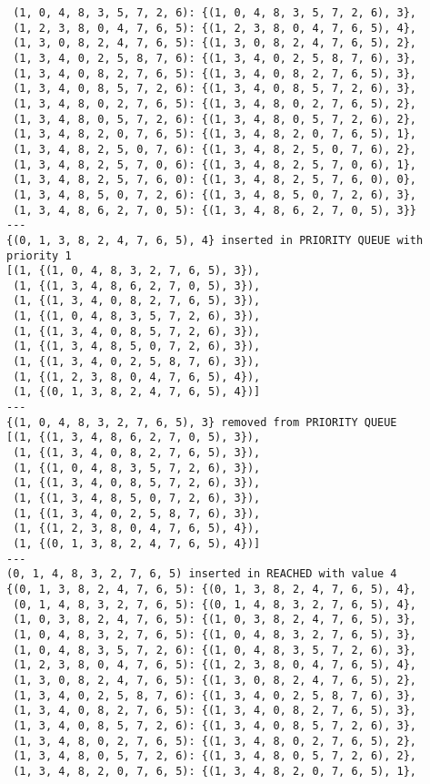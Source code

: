 \documentclass{article}
\begin{document}
\begin{verbatim}
 (1, 0, 4, 8, 3, 5, 7, 2, 6): {(1, 0, 4, 8, 3, 5, 7, 2, 6), 3},
 (1, 2, 3, 8, 0, 4, 7, 6, 5): {(1, 2, 3, 8, 0, 4, 7, 6, 5), 4},
 (1, 3, 0, 8, 2, 4, 7, 6, 5): {(1, 3, 0, 8, 2, 4, 7, 6, 5), 2},
 (1, 3, 4, 0, 2, 5, 8, 7, 6): {(1, 3, 4, 0, 2, 5, 8, 7, 6), 3},
 (1, 3, 4, 0, 8, 2, 7, 6, 5): {(1, 3, 4, 0, 8, 2, 7, 6, 5), 3},
 (1, 3, 4, 0, 8, 5, 7, 2, 6): {(1, 3, 4, 0, 8, 5, 7, 2, 6), 3},
 (1, 3, 4, 8, 0, 2, 7, 6, 5): {(1, 3, 4, 8, 0, 2, 7, 6, 5), 2},
 (1, 3, 4, 8, 0, 5, 7, 2, 6): {(1, 3, 4, 8, 0, 5, 7, 2, 6), 2},
 (1, 3, 4, 8, 2, 0, 7, 6, 5): {(1, 3, 4, 8, 2, 0, 7, 6, 5), 1},
 (1, 3, 4, 8, 2, 5, 0, 7, 6): {(1, 3, 4, 8, 2, 5, 0, 7, 6), 2},
 (1, 3, 4, 8, 2, 5, 7, 0, 6): {(1, 3, 4, 8, 2, 5, 7, 0, 6), 1},
 (1, 3, 4, 8, 2, 5, 7, 6, 0): {(1, 3, 4, 8, 2, 5, 7, 6, 0), 0},
 (1, 3, 4, 8, 5, 0, 7, 2, 6): {(1, 3, 4, 8, 5, 0, 7, 2, 6), 3},
 (1, 3, 4, 8, 6, 2, 7, 0, 5): {(1, 3, 4, 8, 6, 2, 7, 0, 5), 3}}
---
{(0, 1, 3, 8, 2, 4, 7, 6, 5), 4} inserted in PRIORITY QUEUE with priority 1
[(1, {(1, 0, 4, 8, 3, 2, 7, 6, 5), 3}),
 (1, {(1, 3, 4, 8, 6, 2, 7, 0, 5), 3}),
 (1, {(1, 3, 4, 0, 8, 2, 7, 6, 5), 3}),
 (1, {(1, 0, 4, 8, 3, 5, 7, 2, 6), 3}),
 (1, {(1, 3, 4, 0, 8, 5, 7, 2, 6), 3}),
 (1, {(1, 3, 4, 8, 5, 0, 7, 2, 6), 3}),
 (1, {(1, 3, 4, 0, 2, 5, 8, 7, 6), 3}),
 (1, {(1, 2, 3, 8, 0, 4, 7, 6, 5), 4}),
 (1, {(0, 1, 3, 8, 2, 4, 7, 6, 5), 4})]
---
{(1, 0, 4, 8, 3, 2, 7, 6, 5), 3} removed from PRIORITY QUEUE
[(1, {(1, 3, 4, 8, 6, 2, 7, 0, 5), 3}),
 (1, {(1, 3, 4, 0, 8, 2, 7, 6, 5), 3}),
 (1, {(1, 0, 4, 8, 3, 5, 7, 2, 6), 3}),
 (1, {(1, 3, 4, 0, 8, 5, 7, 2, 6), 3}),
 (1, {(1, 3, 4, 8, 5, 0, 7, 2, 6), 3}),
 (1, {(1, 3, 4, 0, 2, 5, 8, 7, 6), 3}),
 (1, {(1, 2, 3, 8, 0, 4, 7, 6, 5), 4}),
 (1, {(0, 1, 3, 8, 2, 4, 7, 6, 5), 4})]
---
(0, 1, 4, 8, 3, 2, 7, 6, 5) inserted in REACHED with value 4
{(0, 1, 3, 8, 2, 4, 7, 6, 5): {(0, 1, 3, 8, 2, 4, 7, 6, 5), 4},
 (0, 1, 4, 8, 3, 2, 7, 6, 5): {(0, 1, 4, 8, 3, 2, 7, 6, 5), 4},
 (1, 0, 3, 8, 2, 4, 7, 6, 5): {(1, 0, 3, 8, 2, 4, 7, 6, 5), 3},
 (1, 0, 4, 8, 3, 2, 7, 6, 5): {(1, 0, 4, 8, 3, 2, 7, 6, 5), 3},
 (1, 0, 4, 8, 3, 5, 7, 2, 6): {(1, 0, 4, 8, 3, 5, 7, 2, 6), 3},
 (1, 2, 3, 8, 0, 4, 7, 6, 5): {(1, 2, 3, 8, 0, 4, 7, 6, 5), 4},
 (1, 3, 0, 8, 2, 4, 7, 6, 5): {(1, 3, 0, 8, 2, 4, 7, 6, 5), 2},
 (1, 3, 4, 0, 2, 5, 8, 7, 6): {(1, 3, 4, 0, 2, 5, 8, 7, 6), 3},
 (1, 3, 4, 0, 8, 2, 7, 6, 5): {(1, 3, 4, 0, 8, 2, 7, 6, 5), 3},
 (1, 3, 4, 0, 8, 5, 7, 2, 6): {(1, 3, 4, 0, 8, 5, 7, 2, 6), 3},
 (1, 3, 4, 8, 0, 2, 7, 6, 5): {(1, 3, 4, 8, 0, 2, 7, 6, 5), 2},
 (1, 3, 4, 8, 0, 5, 7, 2, 6): {(1, 3, 4, 8, 0, 5, 7, 2, 6), 2},
 (1, 3, 4, 8, 2, 0, 7, 6, 5): {(1, 3, 4, 8, 2, 0, 7, 6, 5), 1},

\end{verbatim}
\end{document}
